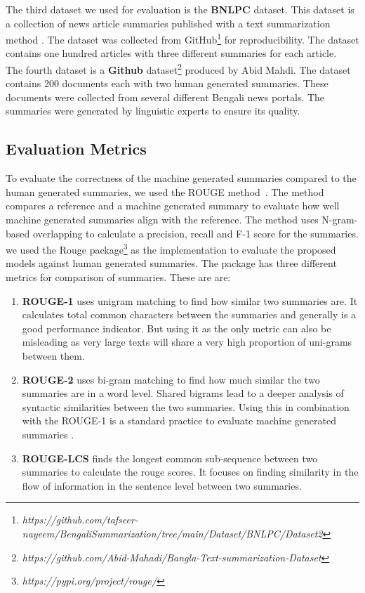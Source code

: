 The third dataset we used for evaluation is the \textbf{BNLPC} \cite{Hque-2015-BNLPC-Dataset} dataset. This dataset is a collection of news article summaries published with a text summarization method \cite{Hque-2015-BNLPC-Dataset}. The dataset was collected from GitHub\footnote{\textit{https://github.com/tafseer-nayeem/BengaliSummarization/tree/main/Dataset/BNLPC/Dataset2}} for reproducibility. The dataset contains one hundred articles with three different summaries for each article.\\

The fourth dataset is a \textbf{Github} dataset\footnote{\textit{https://github.com/Abid-Mahadi/Bangla-Text-summarization-Dataset}} produced by Abid Mahdi. The dataset contains 200 documents each with two human generated summaries. These documents were collected from several different Bengali news portals. The summaries were generated by linguistic experts to ensure its quality.

\subsection{Evaluation Metrics}\label{subsec:evaluation-metrics}
To evaluate the correctness of the machine generated summaries compared to the human generated summaries, we used the ROUGE method~\cite{lin-2004-rouge}. The method compares a reference and a machine generated summary to evaluate how well machine generated summaries align with the reference. The method uses N-gram-based overlapping to calculate a precision, recall and F-1 score for the summaries. we used the Rouge package\footnote{\textit{https://pypi.org/project/rouge/}} as the implementation to evaluate the proposed models against human generated summaries. The package has three different metrics for comparison of summaries. These are are:

\begin{enumerate}
    \item \textbf{ROUGE-1} uses unigram matching to find how similar two summaries are. It calculates total common characters between the summaries and generally is a good performance indicator. But using it as the only metric can also be misleading as very large texts will share a very high proportion of uni-grams between them.
    
    \item \textbf{ROUGE-2} uses bi-gram matching to find how much similar the two summaries are in a word level. Shared bigrams lead to a deeper analysis of syntactic similarities between the two summaries. Using this in combination with the ROUGE-1 is a standard practice to evaluate machine generated summaries \cite{wafaa-2021-summary-comprehensive-review}.
    
    \item \textbf{ROUGE-LCS} finds the longest common sub-sequence between two summaries to calculate the rouge scores. It focuses on finding similarity in the flow of information in the sentence level between two summaries.
\end{enumerate}

